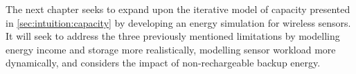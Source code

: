 The next chapter seeks to expand upon the iterative model of capacity presented in \cref{sec:intuition:capacity} by developing an energy simulation for wireless sensors. 
It will seek to address the three previously mentioned limitations by modelling energy income and storage more realistically, modelling sensor workload more dynamically, and considers the impact of non-rechargeable backup energy. 

%    
%    
%    
%     
%    
%    
%    
%     
%    
%     
%    
%
%  
%   
%    
%    
%    
%   
%    
%    
%    


